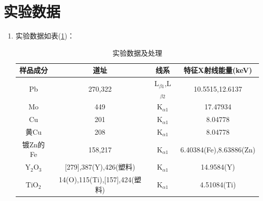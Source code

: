 \documentclass[a4paper]{article}
\begin{document}
\section{实验数据}
\begin{enumerate}
\item 实验数据如表(\ref{data})：
\begin{table}[!h]
\centering
\caption{实验数据及处理}
\label{data}
\begin{tabular}{|c|c|c|c|}
\hline
样品成分     & 道址   & 线系 & 特征X射线能量(keV) \\ \hline
Pb       & 270,322   & L$_{\beta 1}$,L$_{\beta2}$ & 10.5515,12.6137             \\ \hline
Mo       & 449       & K$_{\alpha 1}$ & 17.47934 \\ \hline
Cu       & 201       & K$_{\alpha 1}$ & 8.04778 \\ \hline
黄Cu     & 208       & K$_{\alpha 1}$ & 8.04778 \\ \hline
镀Zn的Fe & 158,217   & K$_{\alpha 1}$ & 6.40384(Fe),8.63886(Zn) \\ \hline
$\text{Y}_2\text{O}_3$ & [279],387(Y),426(塑料)    & K$_{\alpha 1}$ & 14.9584(Y) \\ \hline
$\text{TiO}_2$  & 14(O),115(Ti),[157],424(塑料) & K$_{\alpha 1}$ & 4.51084(Ti) \\ \hline
\end{tabular}
\end{table}


\end{enumerate}
\end{document}
